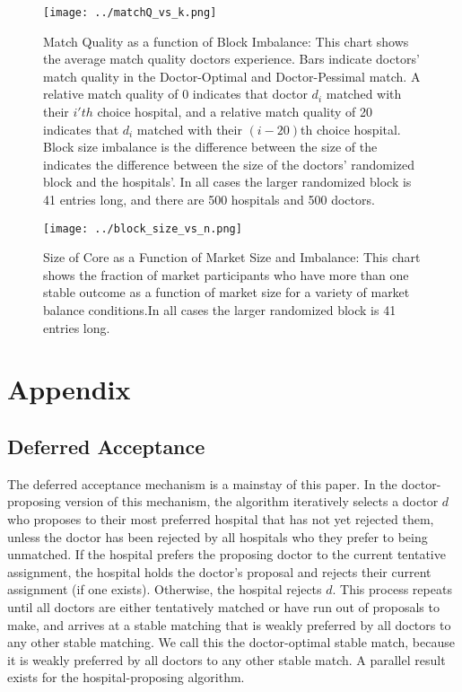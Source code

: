 \documentclass[WP]{AEA}
\begin{document}
\begin{figure}[h]
	\texttt{[image: ../matchQ\_vs\_k.png]}
	\caption{Match Quality as a function of Block Imbalance: This chart shows the average match quality doctors experience. Bars indicate doctors' match quality in the Doctor-Optimal and Doctor-Pessimal match. A relative match quality of 0 indicates that doctor $d_i$ matched with their $i'th$ choice hospital, and a relative match quality of 20 indicates that $d_i$ matched with their $(i-20)$th choice hospital. Block size imbalance is the difference between the size of the indicates the difference between the size of the doctors' randomized block and the hospitals'. In all cases the larger randomized block is 41 entries long, and there are 500 hospitals and 500 doctors.  }
	\label{fig:rank_k_Variable}
\end{figure}


\begin{figure}[h]
	\texttt{[image: ../block\_size\_vs\_n.png]}
	\caption{Size of Core as a Function of Market Size and Imbalance: This chart shows the fraction of market participants who have more than one stable outcome as a function of market size for a variety of market balance conditions.In all cases the larger randomized block is 41 entries long.}
	\label{fig:size_N_Variable_offset}
\end{figure}








\appendix



\section{ Appendix}

\subsection{Deferred Acceptance}
The deferred acceptance mechanism is a mainstay of this paper. In the doctor-proposing version of this mechanism, the algorithm iteratively selects a doctor $d$ who proposes to their most preferred hospital that has not yet rejected them, unless the doctor has been rejected by all hospitals who they prefer to being unmatched.  If the hospital prefers the proposing doctor to the current tentative assignment, the hospital holds the doctor's proposal and rejects their current assignment (if one exists). Otherwise, the hospital rejects $d$.  This process repeats until all doctors are either tentatively matched or have run out of proposals to make, and arrives at a stable matching that is weakly preferred by all doctors to any other stable matching.  We call this the doctor-optimal stable match, because it is weakly preferred by all doctors to any other stable match.  A parallel result exists for the hospital-proposing algorithm.
\end{document}
